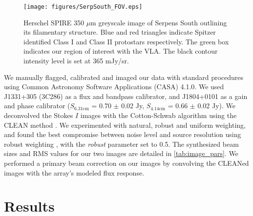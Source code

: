 \documentclass[apj]{emulateapj}
\begin{document}
\begin{figure}[h!]
\label{fig:serpsouth_fov}
\centering
\texttt{[image: figures/SerpSouth\_FOV.eps]}
\caption{\small{Herschel SPIRE 350 $\mu$m greyscale image of Serpens South outlining its filamentary structure. Blue and red triangles indicate Spitzer identified Class I and Class II protostars respectively. The green box indicates our region of interest with the VLA. The black contour intensity level is set at 365 mJy/sr.}}
\end{figure}

We manually flagged, calibrated and imaged our data with standard procedures using Common Astronomy Software Applications (CASA) 4.1.0. We used J1331+305 (3C286) as a flux and bandpass calibrator, and J1804+0101 as a gain and phase calibrator ($S_{6.31\text{cm}}$ = 0.70 $\pm$ 0.02 Jy, $S_{4.14\text{cm}}$ = 0.66 $\pm$ 0.02 Jy). We deconvolved the Stokes $I$ images with the Cotton-Schwab algorithm \citep{Schwab84} using the CLEAN method \citep{Hogbom74,Clark80}. We experimented with natural, robust and uniform weighting, and found the best compromise between noise level and source resolution using robust weighting \citep{Briggs95}, with the \emph{robust} parameter set to 0.5. The synthesized beam sizes and RMS values for our two images are detailed in \autoref{tab:image_pars}. We performed a primary beam correction on our images by convolving the CLEANed images with the array's modeled flux response.




\section{Results}
\label{sec:results}
\end{document}
